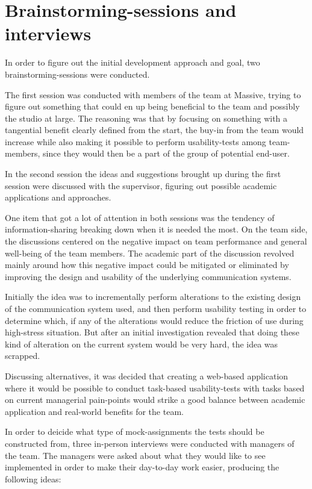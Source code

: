 \section{Brainstorming-sessions and interviews}{\label{label_sectionIdeas}

  In order to figure out the initial development approach and goal, two
  brainstorming-sessions were conducted.

  The first session was conducted with members of the team at Massive, trying
  to figure out something that could en up being beneficial to the team and
  possibly the studio at large. The reasoning was that by focusing on something
  with a tangential benefit clearly defined from the start, the buy-in
  from the team would increase while also making it possible to perform
  usability-tests among team-members, since they would then be a part of the
  group of potential end-user.

  In the second session the ideas and suggestions brought up during the first
  session were discussed with the supervisor, figuring out possible academic
  applications and approaches.

  One item that got a lot of attention in both sessions was the tendency of
  information-sharing breaking down when it is needed the most. On the team
  side, the discussions centered on the negative impact on team performance and
  general well-being of the team members. The academic part of the discussion
  revolved mainly around how this negative impact could be mitigated or
  eliminated by improving the design and usability of the underlying
  communication systems.

  Initially the idea was to incrementally perform alterations to the existing
  design of the communication system used, and then perform usability testing in
  order to determine which, if any of the alterations would reduce the friction
  of use during high-stress situation. But after an initial investigation
  revealed that doing these kind of alteration on the current system would be
  very hard, the idea was scrapped.

  Discussing alternatives, it was decided that creating a web-based application
  where it would be possible to conduct task-based usability-tests with tasks
  based on current managerial pain-points would strike a good balance between
  academic application and real-world benefits for the team.

  In order to deicide what type of mock-assignments the tests should be
  constructed from, three in-person interviews were conducted with managers of
  the team. The managers were asked about what they would like to see
  implemented in order to make their day-to-day work easier, producing the
  following ideas:

}
